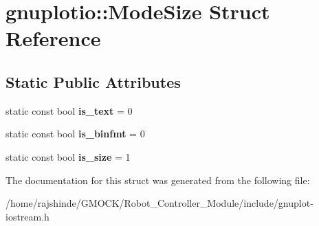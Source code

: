 \hypertarget{structgnuplotio_1_1_mode_size}{}\section{gnuplotio\+:\+:Mode\+Size Struct Reference}
\label{structgnuplotio_1_1_mode_size}
\subsection*{Static Public Attributes}
\begin{DoxyCompactItemize}
\item 
static const bool {\bfseries is\+\_\+text} = 0\hypertarget{structgnuplotio_1_1_mode_size_aa01840f76877ae7c8bad254dae28e32c}{}\label{structgnuplotio_1_1_mode_size_aa01840f76877ae7c8bad254dae28e32c}

\item 
static const bool {\bfseries is\+\_\+binfmt} = 0\hypertarget{structgnuplotio_1_1_mode_size_ac5243e8e4910f2f6a2724b9fc0de4ff9}{}\label{structgnuplotio_1_1_mode_size_ac5243e8e4910f2f6a2724b9fc0de4ff9}

\item 
static const bool {\bfseries is\+\_\+size} = 1\hypertarget{structgnuplotio_1_1_mode_size_aa20ae9f1ce222504489db33d13eb46c0}{}\label{structgnuplotio_1_1_mode_size_aa20ae9f1ce222504489db33d13eb46c0}

\end{DoxyCompactItemize}


The documentation for this struct was generated from the following file\+:\begin{DoxyCompactItemize}
\item 
/home/rajshinde/\+G\+M\+O\+C\+K/\+Robot\+\_\+\+Controller\+\_\+\+Module/include/gnuplot-\/iostream.\+h\end{DoxyCompactItemize}
